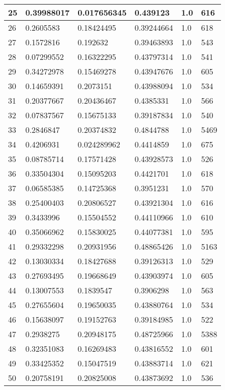 \begin{longtable}{|l|l|l|l|l|l|}
25 & 0.39988017 & 0.017656345 & 0.439123 & 1.0 & 616 \\ \hline 
26 & 0.2605583 & 0.18424495 & 0.39244664 & 1.0 & 618 \\ \hline 
27 & 0.1572816 & 0.192632 & 0.39463893 & 1.0 & 543 \\ \hline 
28 & 0.07299552 & 0.16322295 & 0.43797314 & 1.0 & 541 \\ \hline 
29 & 0.34272978 & 0.15469278 & 0.43947676 & 1.0 & 605 \\ \hline 
30 & 0.14659391 & 0.2073151 & 0.43988094 & 1.0 & 534 \\ \hline 
31 & 0.20377667 & 0.20436467 & 0.4385331 & 1.0 & 566 \\ \hline 
32 & 0.07837567 & 0.15675133 & 0.39187834 & 1.0 & 540 \\ \hline 
33 & 0.2846847 & 0.20374832 & 0.4844788 & 1.0 & 5469 \\ \hline 
34 & 0.4206931 & 0.024289962 & 0.4414859 & 1.0 & 675 \\ \hline 
35 & 0.08785714 & 0.17571428 & 0.43928573 & 1.0 & 526 \\ \hline 
36 & 0.33504304 & 0.15095203 & 0.4421701 & 1.0 & 618 \\ \hline 
37 & 0.06585385 & 0.14725368 & 0.3951231 & 1.0 & 570 \\ \hline 
38 & 0.25400403 & 0.20806527 & 0.43921304 & 1.0 & 616 \\ \hline 
39 & 0.3433996 & 0.15504552 & 0.44110966 & 1.0 & 610 \\ \hline 
40 & 0.35066962 & 0.15830025 & 0.44077381 & 1.0 & 595 \\ \hline 
41 & 0.29332298 & 0.20931956 & 0.48865426 & 1.0 & 5163 \\ \hline 
42 & 0.13030334 & 0.18427688 & 0.39126313 & 1.0 & 529 \\ \hline 
43 & 0.27693495 & 0.19668649 & 0.43903974 & 1.0 & 605 \\ \hline 
44 & 0.13007553 & 0.1839547 & 0.3906298 & 1.0 & 563 \\ \hline 
45 & 0.27655604 & 0.19650035 & 0.43880764 & 1.0 & 534 \\ \hline 
46 & 0.15638097 & 0.19152763 & 0.39184985 & 1.0 & 522 \\ \hline 
47 & 0.2938275 & 0.20948175 & 0.48725966 & 1.0 & 5388 \\ \hline 
48 & 0.32351083 & 0.16269483 & 0.43816552 & 1.0 & 601 \\ \hline 
49 & 0.33425352 & 0.15047519 & 0.43883714 & 1.0 & 621 \\ \hline 
50 & 0.20758191 & 0.20825008 & 0.43873692 & 1.0 & 536 \\ \hline 
\end{longtable}